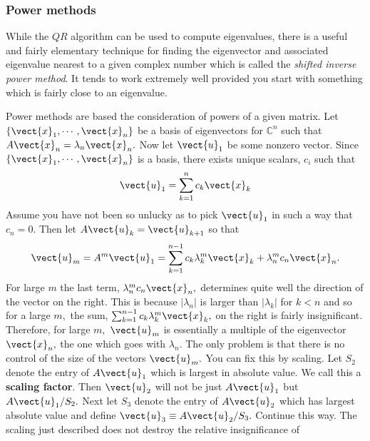 \subsubsection{Power methods}

While the $QR$ algorithm can be used to compute eigenvalues, there is a useful and fairly elementary technique for
finding the eigenvector and associated eigenvalue nearest to a given complex number which
is called the {\em shifted inverse power method}. It tends to work extremely well provided you
start with something which is fairly close to an eigenvalue.

Power methods are based the consideration of powers of a given matrix. Let $
\left\{ 
\vect{x}_{1},\cdots ,\vect{x}_{n}\right\} $ be a basis of eigenvectors for $
\mathbb{C}^{n}$ such that $A\vect{x}_{n}=\lambda _{n}\vect{x}_{n}.$ Now let $
\vect{u}_{1}$ be some nonzero vector. Since $\left\{ \vect{x}_{1},\cdots ,\vect{x}_{n}\right\} $ is a basis, there exists unique scalars, $c_{i}$ such that 
\begin{equation*}
\vect{u}_{1}=\sum_{k=1}^{n}c_{k}\vect{x}_{k}
\end{equation*}
Assume you have not been so unlucky as to pick $\vect{u}_{1}$ in such a way
that $c_{n}=0.$ Then let $A\vect{u}_{k}=\vect{u}_{k+1}$ so that 
\begin{equation}
\vect{u}_{m}=A^{m}\vect{u}_{1}=\sum_{k=1}^{n-1}c_{k}\lambda _{k}^{m}\vect{x}
_{k}+\lambda _{n}^{m}c_{n}\vect{x}_{n}.  \label{20maye1}
\end{equation}
For large $m$ the last term, $\lambda _{n}^{m}c_{n}\vect{x}_{n},$ determines
quite well the direction of the vector on the right. This is because $
\left\vert \lambda _{n}\right\vert $ is larger than $\left\vert \lambda
_{k}\right\vert $ for $k<n$ and so for a large $m,$ the sum, $\sum_{k=1}^{n-1}c_{k}\lambda _{k}^{m}\vect{x}_{k},$ on the right is fairly
insignificant. Therefore, for large $m,$ $\vect{u}_{m}$ is essentially a
multiple of the eigenvector $\vect{x}_{n},$ the one which goes with $\lambda
_{n}.$ The only problem is that there is no control of the size of the
vectors $\vect{u}_{m}.$ You can fix this by scaling. Let $S_{2}$ denote the
entry of $A\vect{u}_{1}$ which is largest in absolute value. We call this a 
 \textbf{scaling factor}. Then $\vect{u}_{2}$ will not be just $A\vect{u}_{1}$ but $A\vect{u}_{1}/S_{2}.$ Next
let $S_{3}$ denote the entry of $A\vect{u}_{2}$ which has largest absolute
value and define $\vect{u}_{3}\equiv A\vect{u}_{2}/S_{3}.$ Continue this way.
The scaling just described does not destroy the relative insignificance of
